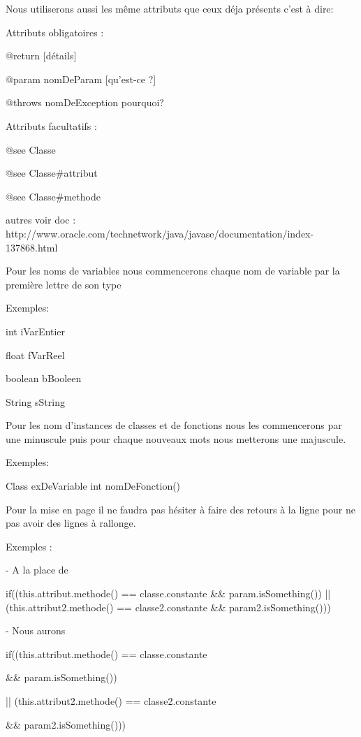 Nous utiliserons aussi les même attributs que ceux déja présents c'est à dire:

\begin{flushleft}
 Attributs obligatoires :
\end{flushleft}

    @return [détails]

    @param nomDeParam [qu'est-ce ?]

    @throws nomDeException pourquoi?

\begin{flushleft}
 Attributs facultatifs :
\end{flushleft}

    @see Classe

    @see Classe\#attribut

    @see Classe\#methode

    autres voir doc :  http://www.oracle.com/technetwork/java/javase/documentation/index-137868.html

\begin{flushleft}
 Pour les noms de variables nous commencerons chaque nom de variable par la première lettre de son type

 Exemples:
\end{flushleft}

   int iVarEntier 

   float fVarReel

   boolean bBooleen

   String sString

\begin{flushleft}
 Pour les nom d'instances de classes et de fonctions nous les commencerons par une minuscule puis pour chaque nouveaux mots nous metterons une majuscule.

 Exemples:
\end{flushleft}

   Class exDeVariable
   int nomDeFonction()

\begin{flushleft}
 Pour la mise en page il ne faudra pas hésiter à faire des retours à la ligne pour ne pas avoir des lignes à rallonge.

 Exemples :

   - A la place de
\end{flushleft}

      if((this.attribut.methode() == classe.constante \&\& param.isSomething()) || (this.attribut2.methode() == classe2.constante \&\& param2.isSomething()))

\begin{flushleft}
    - Nous aurons
\end{flushleft}

      if((this.attribut.methode() == classe.constante

    	\&\& param.isSomething())

        || (this.attribut2.methode() == classe2.constante

        \&\& param2.isSomething()))
